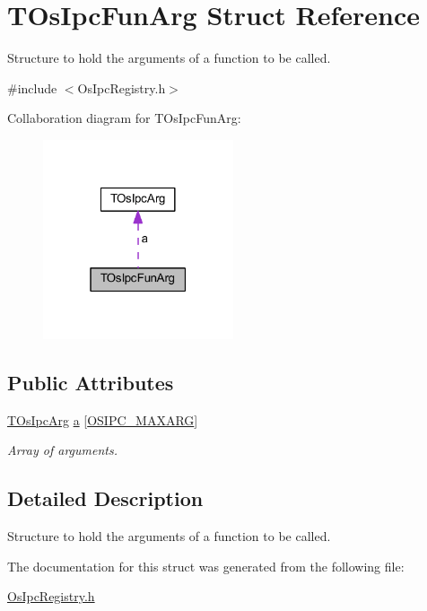 \hypertarget{structTOsIpcFunArg}{}\section{T\+Os\+Ipc\+Fun\+Arg Struct Reference}
\label{structTOsIpcFunArg}


Structure to hold the arguments of a function to be called.  




{\ttfamily \#include $<$Os\+Ipc\+Registry.\+h$>$}



Collaboration diagram for T\+Os\+Ipc\+Fun\+Arg\+:
\nopagebreak
\begin{figure}[H]
\begin{center}
\leavevmode
\includegraphics[width=159pt]{structTOsIpcFunArg__coll__graph}
\end{center}
\end{figure}
\subsection*{Public Attributes}
\begin{DoxyCompactItemize}
\item 
\mbox{\label{structTOsIpcFunArg_a3a3b365a1895aa5a420050557211db9f}} 
\hyperlink{unionTOsIpcArg}{T\+Os\+Ipc\+Arg} \hyperlink{structTOsIpcFunArg_a3a3b365a1895aa5a420050557211db9f}{a} \mbox{[}\hyperlink{OsIpcRegistry_8h_a0c51094eb9214b8ed7d1af23581342e1}{O\+S\+I\+P\+C\+\_\+\+M\+A\+X\+A\+RG}\mbox{]}
\begin{DoxyCompactList}\small\item\em Array of arguments. \end{DoxyCompactList}\end{DoxyCompactItemize}


\subsection{Detailed Description}
Structure to hold the arguments of a function to be called. 

The documentation for this struct was generated from the following file\+:\begin{DoxyCompactItemize}
\item 
\hyperlink{OsIpcRegistry_8h}{Os\+Ipc\+Registry.\+h}\end{DoxyCompactItemize}
